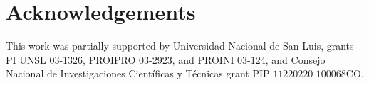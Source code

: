 \documentclass[11pt]{article}
\begin{document}
%		
%		


\section*{Acknowledgements}
This work was partially supported by Universidad Nacional de San Luis, grants PI UNSL 03-1326, PROIPRO 03-2923, and PROINI 03-124, and Consejo Nacional de Investigaciones Cient\'ificas y T\'ecnicas grant PIP $11220220$ $100068$CO. 

\end{document}
